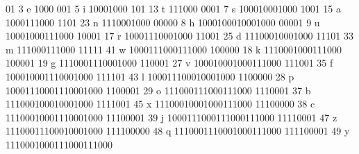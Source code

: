 01		3	e	1000
001		5	i	10001000
101		13	t	111000
0001		7	s	100010001000
1001		15	a	1000111000
1101		23	n	1110001000
00000		8	h	1000100010001000
00001		9	u	10001000111000
10001		17	r	10001110001000
11001		25	d	11100010001000
11101		33	m	111000111000
11111		41	w	1000111000111000
100000		18	k	1110001000111000
100001		19	g	1110001110001000
110001		27	v	100010001000111000
111001		35	f	100010001110001000	
111101		43	l	100011100010001000
1100000		28	p	10001110001110001000
1100001		29	o	111000111000111000
1110001		37	b	111000100010001000
1111001		45	x	11100010001000111000
11100000	38	c	11100010001110001000
11100001	39	j	1000111000111000111000
11110001	47	z	11100011100010001000
111100000	48	q	1110001110001000111000
111100001	49	y	1110001000111000111000


